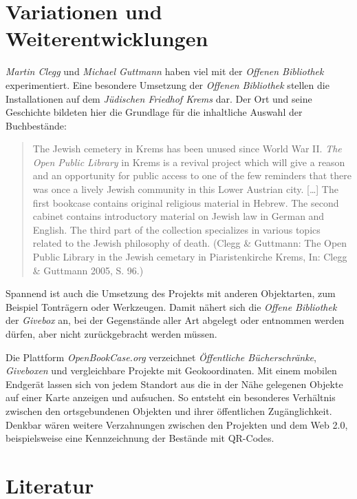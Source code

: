 \documentclass[a4paper,
fontsize=11pt,
oneside,
numbers=noperiodatend,
parskip=half-,
bibliography=totoc,
final
]{scrartcl}
\begin{document}
\section*{Variationen und
Weiterentwicklungen}\label{variationen-und-weiterentwicklungen}

\emph{Martin Clegg} und \emph{Michael Guttmann} haben viel mit der
\emph{Offenen Bibliothek} experimentiert. Eine besondere Umsetzung der
\emph{Offenen} \emph{Bibliothek} stellen die Installationen auf dem
\emph{Jüdischen Friedhof Krems} dar. Der Ort und seine Geschichte
bildeten hier die Grundlage für die inhaltliche Auswahl der
Buchbestände:

\begin{quote}
The Jewish cemetery in Krems has been unused since World War II.
\emph{The Open Public Library} in Krems is a revival project which will
give a reason and an opportunity for public access to one of the few
reminders that there was once a lively Jewish community in this Lower
Austrian city. {[}\ldots{}{]} The first bookcase contains original
religious material in Hebrew. The second cabinet contains introductory
material on Jewish law in German and English. The third part of the
collection specializes in various topics related to the Jewish
philosophy of death. (Clegg \& Guttmann: The Open Public Library in the
Jewish cemetary in Piaristenkirche Krems, In: Clegg \& Guttmann 2005, S.
96.)
\end{quote}

Spannend ist auch die Umsetzung des Projekts mit anderen Objektarten,
zum Beispiel Tonträgern oder Werkzeugen. Damit nähert sich die
\emph{Offene Bibliothek} der \emph{Givebox} an, bei der Gegenstände
aller Art abgelegt oder entnommen werden dürfen, aber nicht
zurückgebracht werden müssen.

Die Plattform \emph{OpenBookCase.org} verzeichnet \emph{Öffentliche
Bücherschränke}, \emph{Giveboxen} und vergleichbare Projekte mit
Geokoordinaten. Mit einem mobilen Endgerät lassen sich von jedem
Standort aus die in der Nähe gelegenen Objekte auf einer Karte anzeigen
und aufsuchen. So entsteht ein besonderes Verhältnis zwischen den
ortsgebundenen Objekten und ihrer öffentlichen Zugänglichkeit. Denkbar
wären weitere Verzahnungen zwischen den Projekten und dem Web 2.0,
beispielsweise eine Kennzeichnung der Bestände mit QR-Codes.

\section*{Literatur}\label{literatur}
\end{document}
